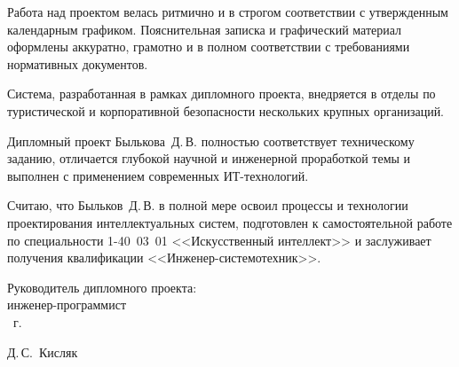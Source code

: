 \begin{singlespace}
{Работа над проектом велась ритмично и в строгом соответствии с утвержденным календарным графиком.
Пояснительная записка и графический материал оформлены аккуратно, грамотно и в полном соответствии с требованиями нормативных документов.

Система, разработанная в рамках дипломного проекта, внедряется в отделы по туристической и корпоративной безопасности нескольких крупных организаций.

Дипломный проект Былькова~Д.\,В. полностью соответствует техническому заданию, отличается глубокой научной и инженерной проработкой темы и выполнен с применением современных ИТ-технологий.

Считаю, что Быльков~Д.\,В. в полной мере освоил процессы и технологии проектирования интеллектуальных систем, подготовлен к самостоятельной работе по специальности 1-40~03~01
<<Искусственный интеллект>> и заслуживает получения квалификации <<Инженер-системотехник>>.

  \vfill
  \noindent
  \begin{minipage}{0.54\textwidth}
    \begin{flushleft}
      Руководитель дипломного проекта:\\
      инженер-программист\\
      
      \underline{\hspace*{2em}} \underline{\hspace*{6.5em}} \the\year{}~г.
    \end{flushleft}
  \end{minipage}
  \begin{minipage}{0.44\textwidth}
    \begin{flushright}
      \underline{\hspace*{3cm}} Д.\,С.~Кисляк
    \end{flushright}
  \end{minipage}
}

\end{singlespace}

\clearpage